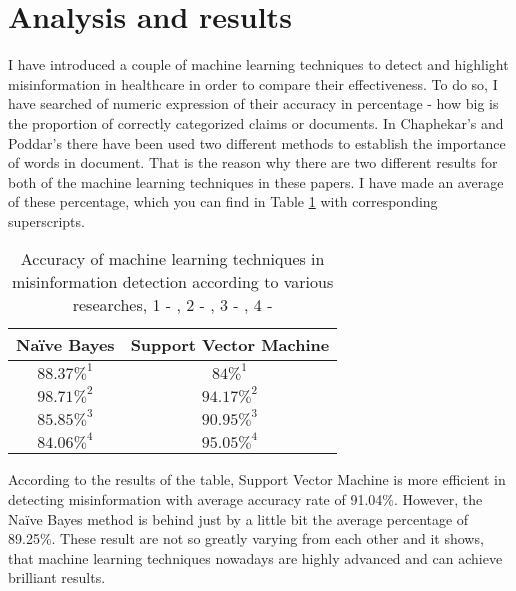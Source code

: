 \documentclass[11pt ,english,a4paper]{article}
\begin{document}

\section{Analysis and results}\label{analysis}
I have introduced a couple of machine learning techniques to detect and highlight misinformation in healthcare in order to compare their effectiveness. To do so, I have searched of numeric expression of their accuracy in percentage - how big is the proportion of correctly categorized claims or documents. In Chaphekar's \cite{chap22unmask} and Poddar's \cite{pod19mach} there have been used two different methods to establish the importance of words in document. That is the reason why there are two different results for both of the machine learning techniques in these papers. I have made an average of these percentage, which you can find in Table \ref{table:results} with corresponding superscripts. 

\begin{table}[H]
\centering
\begin{tabular}{||c c||} 
 \hline
Naïve Bayes & Support Vector Machine\\ [0.5ex] 
 \hline\hline
 $88.37\%^{1}$ & $84\%^{1}$  \\
 \hline
 $98.71\%^{2}$ & $94.17\%^{2}$  \\
 \hline
 $85.85\%^{3}$ & $90.95\%^{3}$  \\
 \hline
 $84.06\%^{4}$ & $95.05\%^{4}$  \\ [1ex]
 \hline
\end{tabular}
\caption{\centering Accuracy of machine learning techniques in misinformation detection according to various researches, 1 - \cite{chap22unmask}, 2 - \cite{bar21health}, 3 - \cite{pod19mach}, 4 - \cite{sha20mach}}
\label{table:results}
\end{table}

According to the results of the table, Support Vector Machine is more efficient in detecting misinformation with average accuracy rate of 91.04\%. However, the Naïve Bayes method is behind just by a little bit the average percentage of 89.25\%. These result are not so greatly varying from each other and it shows, that machine learning techniques nowadays are highly advanced and can achieve brilliant results.
\end{document}
